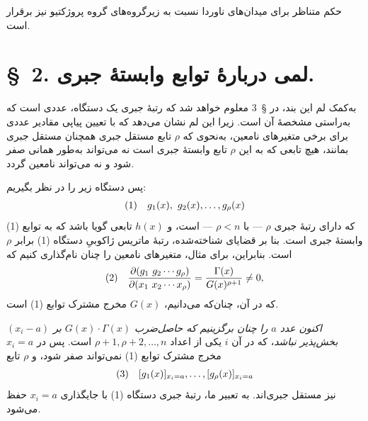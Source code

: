 \documentclass[11pt]{article}
\begin{document}
حکم متناظر برای میدان‌های ناوردا نسبت به زیرگروه‌های گروه پروژکتیو نیز برقرار است.

\section*{\S\ 2. لمی دربارهٔ توابع وابستهٔ جبری.}

به‌کمک لم این بند، در \S\ 3 معلوم خواهد شد که رتبهٔ جبری یک دستگاه، عددی است که به‌راستی مشخصهٔ آن است. زیرا این لم نشان می‌دهد که با تعیین پیاپی مقادیر عددی برای برخی متغیرهای نامعین، به‌نحوی که $\rho$ تابع مستقل جبری همچنان مستقل جبری بمانند، هیچ تابعی که به این $\rho$ تابع وابستهٔ جبری است نه می‌تواند به‌طور همانی صفر شود و نه می‌تواند نامعین گردد.

پس دستگاه زیر را در نظر بگیریم:
\[
\begin{array}{@{}r@{\quad}l@{}}
(1)& g_1(x),\ g_2(x),\ldots,g_\rho(x)
\end{array}
\]
که دارای رتبهٔ جبری $\rho$ --- با $\rho<n$ --- است، و $h(x)$ تابعی گویا باشد که به توابع (1) وابستهٔ جبری است. بنا بر قضایای شناخته‌شده، رتبهٔ ماتریس ژاکوبیِ دستگاه (1) برابر $\rho$ است. بنابراین، برای مثال، متغیرهای نامعین را چنان نام‌گذاری کنیم که
\[
\begin{array}{@{}r@{\quad}l@{}}
(2)& \displaystyle
\frac{\partial(g_1\ g_2\cdots g_\rho)}{\partial(x_1\ x_2\cdots x_\rho)}
=\frac{\Gamma(x)}{G(x)^{\rho+1}}\ne0,
\end{array}
\]
که در آن، چنان‌که می‌دانیم، $G(x)$ مخرج مشترک توابع (1) است.

\emph{اکنون عدد $a$ را چنان برگزینیم که حاصل‌ضرب $G(x)\cdot\Gamma(x)$ بر $(x_i-a)$ بخش‌پذیر نباشد}، که در آن $i$ یکی از اعداد $\rho+1,\rho+2,\ldots,n$ است. پس در $x_i=a$ مخرج مشترک توابع (1) نمی‌تواند صفر شود، و $\rho$ تابع
\[
\begin{array}{@{}r@{\quad}l@{}}
(3)& [g_1(x)]_{x_i=a},\ldots,[g_\rho(x)]_{x_i=a}
\end{array}
\]
نیز مستقل جبری‌اند. به تعبیر ما، رتبهٔ جبری دستگاه (1) با جایگذاری $x_i=a$ حفظ می‌شود.
\end{document}
